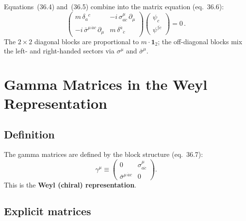 \documentclass[12pt]{article}
\begin{document}
Equations~(36.4) and~(36.5) combine into the matrix equation (eq.~36.6):
\begin{equation}
  \begin{pmatrix}
    m\,\delta_a{}^c & -i\,\sigma^\mu_{a\dot{c}}\,\partial_\mu \\
    -i\,\bar{\sigma}^{\mu\,\dot{a}c}\,\partial_\mu & m\,\delta^{\dot{a}}{}_{\dot{c}}
  \end{pmatrix}
  \begin{pmatrix} \psi_c \\ \psi^{\dagger\dot{c}} \end{pmatrix}
  = 0\,.
  \tag{36.6}
\end{equation}
The $2\times 2$ diagonal blocks are proportional to $m\cdot\mathbf{1}_2$;
the off-diagonal blocks mix the left- and right-handed sectors via $\sigma^\mu$
and $\bar{\sigma}^\mu$.

\section{Gamma Matrices in the Weyl Representation}

\subsection{Definition}

The gamma matrices are defined by the block structure (eq.~36.7):
\begin{equation}
  \gamma^\mu \equiv
  \begin{pmatrix}
    0 & \sigma^\mu_{a\dot{c}} \\
    \bar{\sigma}^{\mu\,\dot{a}c} & 0
  \end{pmatrix}.
  \tag{36.7}
\end{equation}
This is the \textbf{Weyl (chiral) representation}.

\subsection{Explicit matrices}
\end{document}
